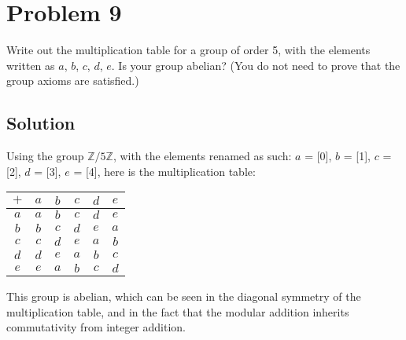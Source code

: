 \documentclass[fleqn]{article}
\begin{document}
    \section{Problem 9}
    Write out the multiplication table for a group of order 5, with the elements written as $a$, $b$, $c$, $d$, $e$.  Is your group abelian?  (You do not need to prove that the group axioms are satisfied.)
        
        \subsection{Solution}
        Using the group $\mathbb{Z}/5\mathbb{Z}$, with the elements renamed as such: $a$ = [0], $b$ = [1], $c$ = [2], $d$ = [3], $e$ = [4], here is the multiplication table: \\
        
        \begin{tabular}{ c|c|c|c|c|c| } 
            $+$ & $a$ & $b$ & $c$ & $d$ & $e$ \\ \hline 
            $a$ & $a$ & $b$ & $c$ & $d$ & $e$ \\ \hline 
            $b$ & $b$ & $c$ & $d$ & $e$ & $a$ \\ \hline 
            $c$ & $c$ & $d$ & $e$ & $a$ & $b$ \\ \hline 
            $d$ & $d$ & $e$ & $a$ & $b$ & $c$ \\ \hline 
            $e$ & $e$ & $a$ & $b$ & $c$ & $d$ \\ \hline
        \end{tabular}
        
        $ $ \\
        
        This group is abelian, which can be seen in the diagonal symmetry of the multiplication table, and in the fact that the modular addition inherits commutativity from integer addition.
        
        
\end{document}
